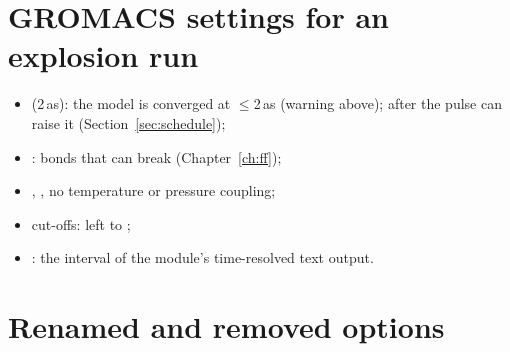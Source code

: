 \section{GROMACS settings for an explosion run}
\begin{itemize}
  \item {} (2\,as): the model is converged at $\le$2\,as (warning above); after the pulse
     can raise it (Section~\ref{sec:schedule});
  \item {}: bonds that can break (Chapter~\ref{ch:ff});
  \item {}, , no temperature or pressure coupling;
  \item cut-offs: left to ;
  \item {}: the interval of the module's time-resolved text output.
\end{itemize}

\section{Renamed and removed options}

